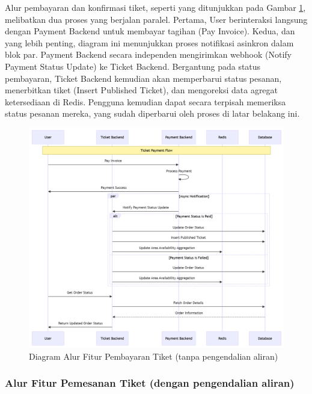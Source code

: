 Alur pembayaran dan konfirmasi tiket, seperti yang ditunjukkan pada Gambar \ref{fig:flow-order-payment-flow}, melibatkan dua proses yang berjalan paralel. Pertama, User berinteraksi langsung dengan Payment Backend untuk membayar tagihan (Pay Invoice). Kedua, dan yang lebih penting, diagram ini menunjukkan proses notifikasi asinkron dalam blok par. Payment Backend secara independen mengirimkan webhook (Notify Payment Status Update) ke Ticket Backend. Bergantung pada status pembayaran, Ticket Backend kemudian akan memperbarui status pesanan, menerbitkan tiket (Insert Published Ticket), dan mengoreksi data agregat ketersediaan di Redis. Pengguna kemudian dapat secara terpisah memeriksa status pesanan mereka, yang sudah diperbarui oleh proses di latar belakang ini.

\begin{figure}[H]
    \centering
    \includegraphics[width=1\textwidth]{resources/chapter-3/order-payment.png}
    \caption{Diagram Alur Fitur Pembayaran Tiket (tanpa pengendalian aliran)}
    \label{fig:flow-order-payment-flow}
\end{figure}

\subsubsection{Alur Fitur Pemesanan Tiket (dengan pengendalian aliran)}

